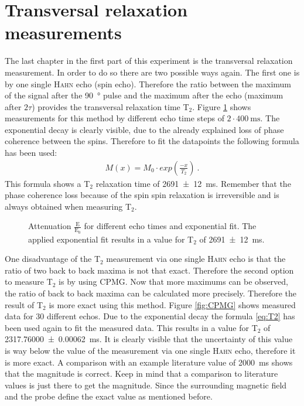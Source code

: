 \section{Transversal relaxation measurements}
\label{sec:Transversalrelaxationmeasurements}
The last chapter in the first part of this experiment is the transversal relaxation measurement. In order to do so there are two possible ways again.\newline
The first one is by one single \textsc{Hahn} echo (spin echo). Therefore the ratio between the maximum of the signal after the \SI{90}{\degree} pulse and the maximum after the echo (maximum after $2\tau$) provides the transversal relaxation time T$_2$. Figure \ref{fig:T2} shows measurements for this method by different echo time steps of $2\cdot \SI{400}{\milli \second}$. The exponential decay is clearly visible, due to the already explained loss of phase coherence between the spins. Therefore to fit the datapoints the following formula has been used:
\begin{align}
    M(x)=M_0 \cdot exp\left(\frac{-x}{T_{2}}\right) \ .
 \label{eq:T2}
\end{align}
This formula shows a T$_2$ relaxation time of \SI{2691 \pm 12}{\milli \second}. Remember that the phase coherence loss because of the spin spin relaxation is irreversible and is always obtained when measuring T$_2$.

\begin{figure}[H]
    \centering
    
    \caption[Attenuation $\frac{\text{E}}{\text{E}_0}$ for different echo times and exponential fit.]{Attenuation $\frac{\text{E}}{\text{E}_0}$ for different echo times and exponential fit. The applied exponential fit results in a value for T$_2$ of \SI{2691 \pm 12}{\milli \second}.}
    \label{fig:T2}
\end{figure}

One disadvantage of the T$_2$ measurement via one single \textsc{Hahn} echo is that the ratio of two back to back maxima is not that exact. Therefore the second option to measure T$_2$ is by using CPMG. Now that more maximums can be observed, the ratio of back to back maxima can be calculated more precisely. Therefore the result of T$_2$ is more exact using this method. Figure \ref{fig:CPMG} shows measured data for 30 different echos. Due to the exponential decay the formula \eqref{eq:T2} has been used again to fit the measured data. This results in a value for T$_2$ of \SI{2317.76000 \pm 0.00062}{\milli \second}. It is clearly visible that the uncertainty of this value is way below the value of the measurement via one single \textsc{Hahn} echo, therefore it is more exact. A comparison with an example literature value of \SI{2000}{\milli \second} \cite{literaturT1} shows that the magnitude is correct. Keep in mind that a comparison to literature values is just there to get the magnitude. Since the surrounding magnetic field and the probe define the exact value as mentioned before.

